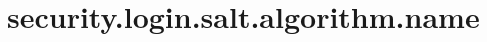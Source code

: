 \section{security.login.salt.algorithm.name}
\label{configuration:SecurityLoginSaltAlgorithmName}
\AvailableInJavaOnly{\TODO}